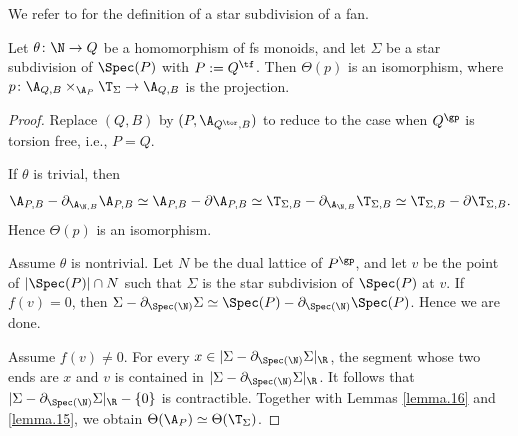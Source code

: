 \documentclass[10pt]{amsart}
\begin{document}
We refer to \cite[Section 11.1]{CLStoric} for the definition of a star subdivision of a fan.

\begin{lem}
\label{lemma.1}
Let $\theta\colon \N\to Q$ be a homomorphism of fs monoids, and let $\Sigma$ be a star subdivision of $\Spec(P)$ with $P:=Q^\tf$.
Then $\Theta(p)$ is an isomorphism, where $p\colon \A_{Q,B}\times_{\A_P}\T_{\Sigma}\to \A_{Q,B}$ is the projection.
\end{lem}
\begin{proof}
Replace $(Q,B)$ by $(P,\A_{Q^\tor,B})$ to reduce to the case when $Q^\gp$ is torsion free, i.e., $P=Q$.

If $\theta$ is trivial, then
\[
\A_{P,B}-\partial_{\A_{\N,B}}\A_{P,B}
\simeq
\A_{P,B}-\partial\A_{P,B}
\simeq 
\T_{\Sigma,B}-\partial_{\A_{\N,B}}\T_{\Sigma,B}
\simeq
\T_{\Sigma,B}-\partial\T_{\Sigma,B}.
\]
Hence $\Theta(p)$ is an isomorphism.

Assume $\theta$ is nontrivial.
Let $N$ be the dual lattice of $P^\gp$, and let $v$ be the point of $|\Spec(P)|\cap N$ such that $\Sigma$ is the star subdivision of $\Spec(P)$ at $v$.
If $f(v)=0$, then $\Sigma-\partial_{\Spec(\N)}\Sigma\simeq \Spec(P)-\partial_{\Spec(\N)}\Spec(P)$.
Hence we are done.

Assume $f(v)\neq 0$.
For every $x\in |\Sigma-\partial_{\Spec(\N)}\Sigma|_{\R}$, the segment whose two ends are $x$ and $v$ is contained in $|\Sigma-\partial_{\Spec(\N)}\Sigma|_{\R}$.
It follows that $|\Sigma-\partial_{\Spec(\N)}\Sigma|_{\R}-\{0\}$ is contractible.
Together with Lemmas \ref{lemma.16} and \ref{lemma.15}, we obtain $\Theta(\A_P)\simeq \Theta(\T_\Sigma)$.
\end{proof}
\end{document}
